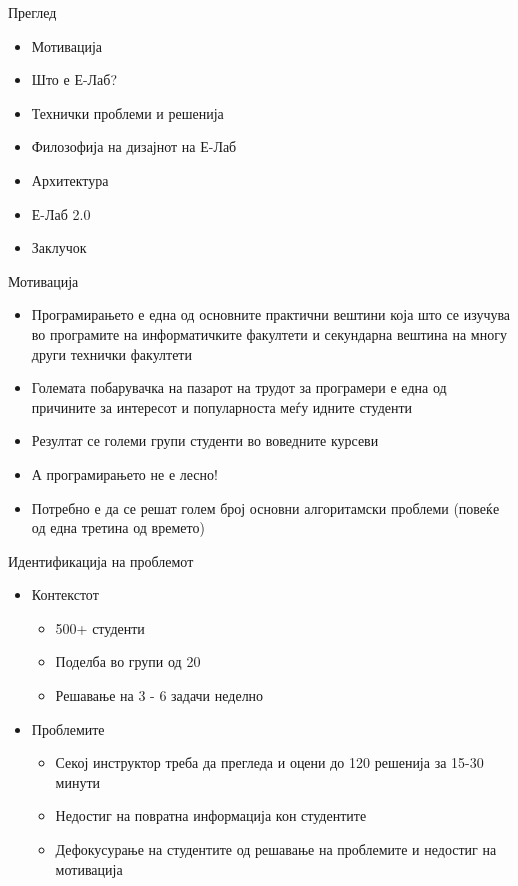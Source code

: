 
\begin{frame}{Преглед}
	\begin{itemize}[<+-| alert@+>]
	  \item Мотивација
	  \item Што е Е-Лаб?
	  \item Технички проблеми и решенија
	  \item Филозофија на дизајнот на Е-Лаб
	  \item Архитектура
	  \item Е-Лаб 2.0
	  \item Заклучок
	\end{itemize}
\end{frame}

\begin{frame}{Мотивација}
	\begin{itemize}[<+-| alert@+>]
	  \item Програмирањето е една од основните практични вештини која што се
	  изучува во програмите на информатичките факултети и секундарна вештина на
	  многу други технички факултети
	  \item Големата побарувачка на пазарот на трудот за програмери е една од
	  причините за интересот и популарноста меѓу идните студенти
	  \item Резултат се големи групи студенти во воведните курсеви
	  \item А програмирањето не е лесно!
	  \item Потребно е да се решат голем број основни алгоритамски проблеми
	  (повеќе од една третина од времето)
	\end{itemize}
\end{frame}

\begin{frame}{Идентификација на проблемот}
	\begin{itemize}[<+-| alert@+>]
	  \item Контекстот
	  \begin{itemize}
	  	\item 500+ студенти
	  	\item Поделба во групи од  20
	  	\item Решавање на 3 - 6 задачи неделно
		\end{itemize}
		\item Проблемите
	  \begin{itemize}
	  \item Секој инструктор треба да прегледа и оцени до 120 решенија за 15-30
	  минути
	  \item Недостиг на повратна информација кон студентите
	  \item Дефокусурање на студентите од решавање на проблемите и недостиг на
	  мотивација
	 \end{itemize}
	\end{itemize}
\end{frame}


